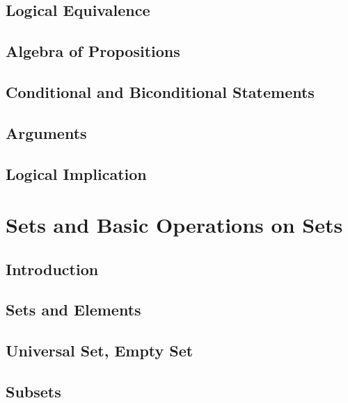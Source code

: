 \documentclass[]{book}
\begin{document}
\subsection{Logical Equivalence}\label{logical-equivalence}

\subsection{Algebra of Propositions}\label{algebra-of-propositions}

\subsection{Conditional and Biconditional
Statements}\label{conditional-and-biconditional-statements}

\subsection{Arguments}\label{arguments}

\subsection{Logical Implication}\label{logical-implication}

\section{Sets and Basic Operations on
Sets}\label{sets-and-basic-operations-on-sets}

\subsection{Introduction}\label{introduction}

\subsection{Sets and Elements}\label{sets-and-elements}

\subsection{Universal Set, Empty Set}\label{universal-set-empty-set}

\subsection{Subsets}\label{subsets}
\end{document}
